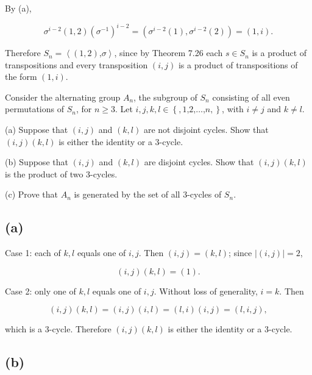 By (a),

\[\sigma^{i - 2}\left( {1,2} \right)\left( \sigma^{- 1} \right)^{i - 2} = \left( {\sigma^{i - 2}(1),\sigma^{i - 2}(2)} \right) = \left( {1,i} \right).\]

Therefore \(S_{n} = \left\langle {\left( {1,2} \right)\text{,}\sigma} \right\rangle\), since by Theorem 7.26 each \(s \in S_{n}\) is a product of transpositions and every transposition \(\left( {i,j} \right)\) is a product of transpositions of the form \(\left( {1,i} \right)\).

Consider the alternating group \(A_{n}\), the subgroup of \(S_{n}\) consisting of all even permutations of \(S_{n}\), for \(n \geq 3\). Let \(i,j,k,l \in \left\{ {,1\text{,}2\text{,}\ldots\text{,}n,} \right\}\), with \(i \neq j\) and \(k \neq l\).

(a) Suppose that \(\left( {i,j} \right)\) and \(\left( {k,l} \right)\) are not disjoint cycles. Show that \(\left( {i,j} \right)\left( {k,l} \right)\) is either the identity or a 3-cycle.

(b) Suppose that \(\left( {i,j} \right)\) and \(\left( {k,l} \right)\) are disjoint cycles. Show that \(\left( {i,j} \right)\left( {k,l} \right)\) is the product of two 3-cycles.

(c) Prove that \(A_{n}\) is generated by the set of all 3-cycles of \(S_{n}\).

\subsection{(a)}

Case 1: each of \(k,l\) equals one of \(i,j\). Then \(\left( {i,j} \right) = \left( {k,l} \right)\); since \(\left| \left( {i,j} \right) \right| = 2\),

\[\left( {i,j} \right)\left( {k,l} \right) = (1).\]

Case 2: only one of \(k,l\) equals one of \(i,j\). Without loss of generality, \(i = k\). Then

\[\left( {i,j} \right)\left( {k,l} \right) = \left( {i,j} \right)\left( {i,l} \right) = \left( {l,i} \right)\left( {i,j} \right) = \left( {l,i,j} \right),\]

which is a 3-cycle. Therefore \(\left( {i,j} \right)\left( {k,l} \right)\) is either the identity or a 3-cycle.

\subsection{(b)}

